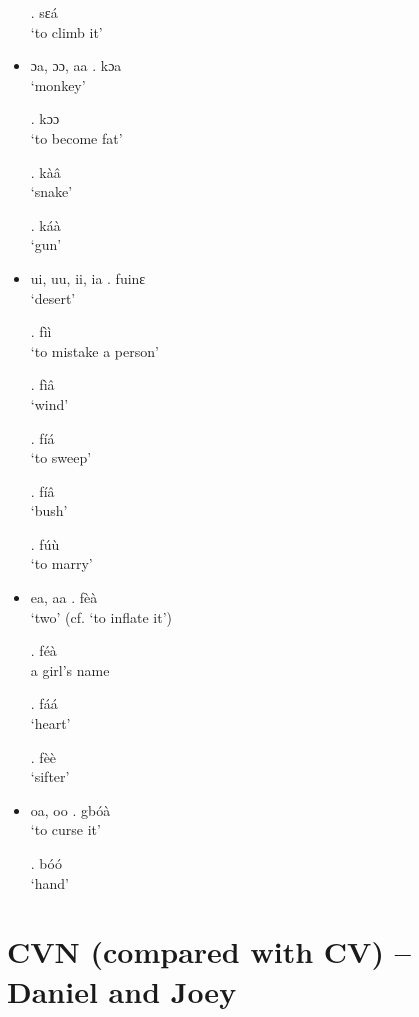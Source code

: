 \documentclass{assets/fieldnotes}
\begin{document}
\begin{itemize}
        \ex. sɛá\\
            `to climb it'

    \item ɔa, ɔɔ, aa
        \ex. kɔa\\
            `monkey'
        
        \ex. kɔɔ\\
            `to become fat'

        \ex. kàâ\\
            `snake'

        \ex. káà\\
            `gun'

    \item ui, uu, ii, ia
        \ex. fuinɛ\\
            `desert'

        \ex. fìì\\
            `to mistake a person'

        \ex. fìâ\\
            `wind'

        \ex. fíá\\
            `to sweep'

        \ex. fíâ\\
            `bush'

        \ex. fúù\\
            `to marry'

    \item ea, aa
        \ex. fèà\\
            `two' (cf. `to inflate it')

        \ex. féà\\
            a girl's name

        \ex. fáá\\
            `heart'

        \ex. fèè\\
            `sifter'

    \item oa, oo
        \ex. gbóà\\
            `to curse it'

        \ex. bóó\\
            `hand'
        
\end{itemize}

\section{CVN (compared with CV) -- Daniel and Joey}
\end{document}
